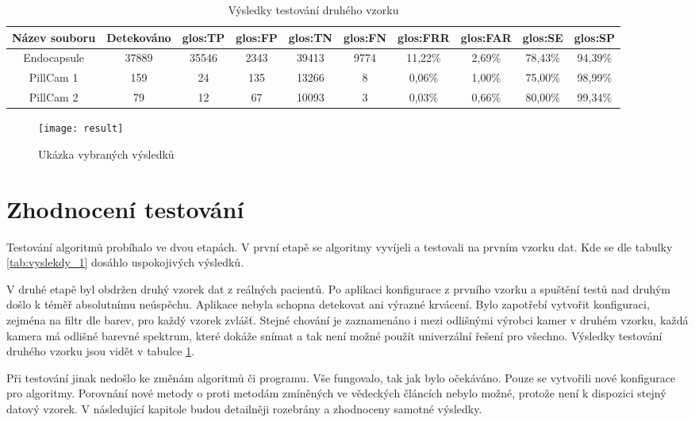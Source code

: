 \begin{table}[h]
	\begin{adjustwidth}{-.5in}{-.5in} 
		\centering
		\begin{tabular}{|c|c|c|c|c|c|c|c|c|c|}
			\hline
				\bf Název souboru & \bf Detekováno & \bf \gls{glos:TP} & \bf \gls{glos:FP} & \bf \gls{glos:TN} & \bf \gls{glos:FN} & \bf \gls{glos:FRR} & \bf \gls{glos:FAR} & \bf \gls{glos:SE} & \bf \gls{glos:SP} \\ \hline
			Endocapsule & 37889 & 35546 & 2343 & 39413 & 9774 & 11,22\% & 2,69\% & 78,43\% & 94,39\% \\ \hline
			PillCam 1 & 159 & 24 & 135 & 13266 & 8 & 0,06\% & 1,00\% & 75,00\% & 98,99\% \\ \hline
			PillCam 2 & 79 & 12 & 67 & 10093 & 3 & 0,03\% & 0,66\% & 80,00\% & 99,34\% \\ \hline
		\end{tabular}
		\caption{Výsledky testování druhého vzorku}
		\label{tab:vyslekdy_2}
	\end{adjustwidth}
\end{table}

\begin{figure}[h]
	\texttt{[image: result]}
	\centering
	\caption{Ukázka vybraných výsledků \label{fig:vysledy}}
\end{figure}

\section{Zhodnocení testování}
Testování algoritmů probíhalo ve dvou etapách. V první etapě se algoritmy vyvíjeli a testovali na prvním vzorku dat. Kde se dle tabulky \ref{tab:vyslekdy_1} dosáhlo uspokojivých výsledků.

V druhé etapě byl obdržen druhý vzorek dat z reálných pacientů. Po aplikaci konfigurace z prvního vzorku a spuštění testů nad druhým došlo k téměř absolutnímu neúspěchu. Aplikace nebyla schopna detekovat ani výrazné krvácení. Bylo zapotřebí vytvořit konfiguraci, zejména na filtr dle barev, pro každý vzorek zvlášť. Stejné chování je zaznamenáno i mezi odlišnými výrobci kamer v druhém vzorku, každá kamera má odlišné barevné spektrum, které dokáže snímat a tak není možné použít univerzální řešení pro všechno. Výsledky testování druhého vzorku jsou vidět v tabulce \ref{tab:vyslekdy_2}.

Při testování jinak nedošlo ke změnám algoritmů či programu. Vše fungovalo, tak jak bylo očekáváno. Pouze se vytvořili nové konfigurace pro algoritmy. Porovnání nové metody o proti metodám zmíněných ve vědeckých článcích nebylo možné, protože není k dispozici stejný datový vzorek. V následující kapitole budou detailněji rozebrány a zhodnoceny samotné výsledky.